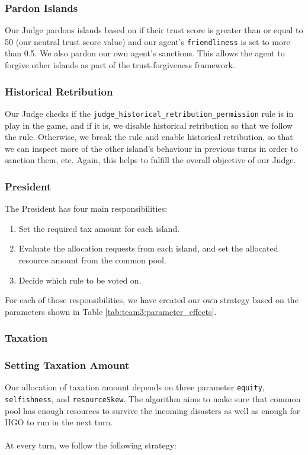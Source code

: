 \documentclass{article}
\begin{document}
\subsubsection*{Pardon Islands}

Our Judge pardons islands based on if their trust score is greater than or equal to 50 (our neutral trust score value) and our agent's \texttt{friendliness} is set to more than 0.5. We also pardon our own agent's sanctions. This allows the agent to forgive other islands as part of the trust-forgiveness framework.

\subsubsection*{Historical Retribution}

Our Judge checks if the \texttt{judge\_historical\_retribution\_permission} rule is in play in the game, and if it is, we disable historical retribution so that we follow the rule. Otherwise, we break the rule and enable historical retribution, so that we can inspect more of the other island's behaviour in previous turns in order to sanction them, etc. Again, this helps to fulfill the overall objective of our Judge.

\subsubsection{President}
The President has four main responsibilities:

\begin{enumerate}
    \item Set the required tax amount for each island.
    \item Evaluate the allocation requests from each island, and set the allocated resource amount from the common pool.
    \item Decide which rule to be voted on.
\end{enumerate}

For each of those responsibilities, we have created our own strategy based on the parameters shown in Table \ref{tab:team3:parameter_effects}.

\subsubsection*{Taxation}
\subsubsection*{Setting Taxation Amount}
Our allocation of taxation amount depends on three parameter \texttt{equity}, \texttt{selfishness}, and \texttt{resourceSkew}. The algorithm aims to make sure that common pool has enough resources to survive the incoming disasters as well as enough for IIGO to run in the next turn.\\\\
At every turn, we follow the following strategy:
\end{document}
